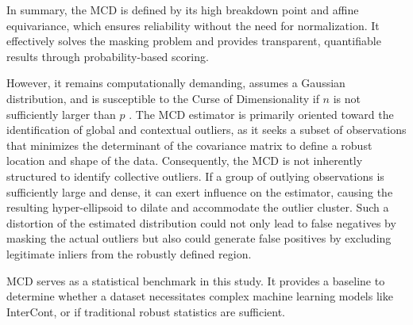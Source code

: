 In summary, the MCD is defined by its high breakdown point and affine equivariance, which ensures reliability without the need for normalization. 
It effectively solves the masking problem and provides transparent, quantifiable results through probability-based scoring. 


However, it remains computationally demanding, assumes a Gaussian distribution, and is susceptible to the Curse of Dimensionality if $n$ is not sufficiently larger than $p$ \citep[p.5]{smiti2020critical}.
The MCD estimator is primarily oriented toward the identification of global and contextual outliers, as it seeks a subset of observations that minimizes the determinant of the covariance matrix to define a robust location and shape of the data. 
Consequently, the MCD is not inherently structured to identify collective outliers. 
If a group of outlying observations is sufficiently large and dense, it can exert influence on the estimator, causing the resulting hyper-ellipsoid to dilate and accommodate the outlier cluster. 
Such a distortion of the estimated distribution could not only lead to false negatives by masking the actual outliers but also could generate false positives by excluding legitimate inliers from the robustly defined region.


MCD serves as a statistical benchmark in this study. 
It provides a baseline to determine whether a dataset necessitates complex machine learning models like InterCont, or if traditional robust statistics are sufficient. 






